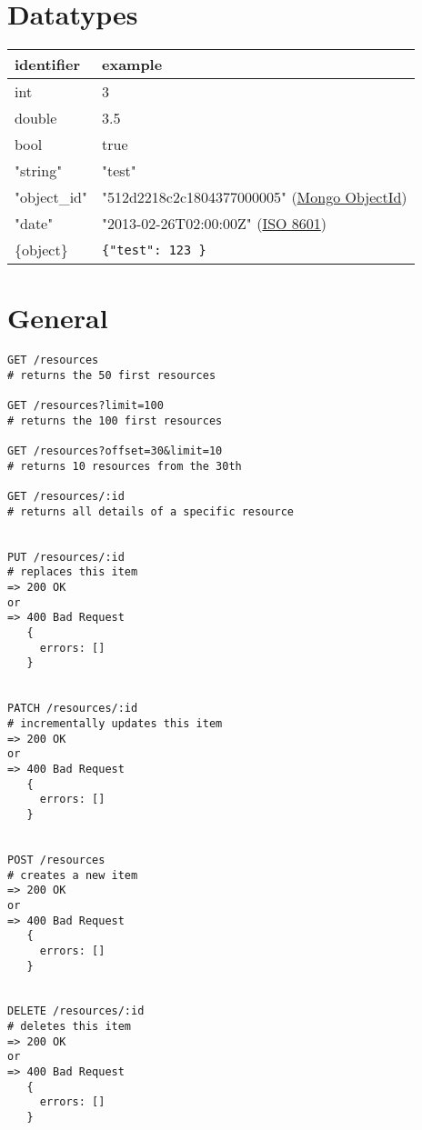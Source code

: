 \label{appendix:REST}


\section{Datatypes}
\begin{tabular}{ l | l }
\hline
identifier & example \\ \hline
int & 3 \\
double & 3.5 \\
bool & true \\
"string" & "test" \\
"object\_id" & "512d2218c2c1804377000005" (\href{http://docs.mongodb.org/manual/reference/object-id/}{Mongo ObjectId}) \\
"date" & "2013-02-26T02:00:00Z" (\href{http://en.wikipedia.org/wiki/ISO_8601}{ISO 8601}) \\
\{object\} & \verb+{"test": 123 }+ \\ \hline
\end{tabular}


\section{General}

\begin{lstlisting}[language=restinterface]
GET /resources
# returns the 50 first resources

GET /resources?limit=100
# returns the 100 first resources

GET /resources?offset=30&limit=10
# returns 10 resources from the 30th

GET /resources/:id
# returns all details of a specific resource


PUT /resources/:id
# replaces this item 
=> 200 OK
or
=> 400 Bad Request
   {
     errors: []
   }


PATCH /resources/:id
# incrementally updates this item
=> 200 OK
or
=> 400 Bad Request
   {
     errors: []
   } 


POST /resources
# creates a new item
=> 200 OK
or
=> 400 Bad Request
   {
     errors: []
   }


DELETE /resources/:id
# deletes this item
=> 200 OK
or
=> 400 Bad Request
   {
     errors: []
   }

\end{lstlisting}


